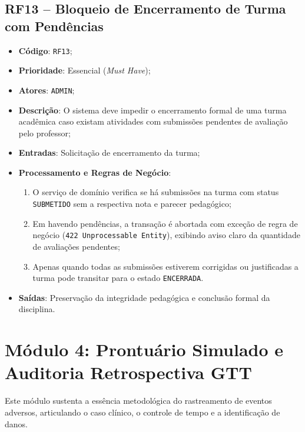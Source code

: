 \subsection{RF13 -- Bloqueio de Encerramento de Turma com Pendências}
\begin{itemize}
    \item \textbf{Código}: \texttt{RF13};
    \item \textbf{Prioridade}: Essencial (\textit{Must Have});
    \item \textbf{Atores}: \texttt{ADMIN};
    \item \textbf{Descrição}: O sistema deve impedir o encerramento formal de uma turma acadêmica caso existam atividades com submissões pendentes de avaliação pelo professor;
    \item \textbf{Entradas}: Solicitação de encerramento da turma;
    \item \textbf{Processamento e Regras de Negócio}:
    \begin{enumerate}
        \item O serviço de domínio verifica se há submissões na turma com status \texttt{SUBMETIDO} sem a respectiva nota e parecer pedagógico;
        \item Em havendo pendências, a transação é abortada com exceção de regra de negócio (\texttt{422 Unprocessable Entity}), exibindo aviso claro da quantidade de avaliações pendentes;
        \item Apenas quando todas as submissões estiverem corrigidas ou justificadas a turma pode transitar para o estado \texttt{ENCERRADA}.
    \end{enumerate}
    \item \textbf{Saídas}: Preservação da integridade pedagógica e conclusão formal da disciplina.
\end{itemize}

\section{Módulo 4: Prontuário Simulado e Auditoria Retrospectiva GTT}
\label{sec_mod4_auditoria}

Este módulo sustenta a essência metodológica do rastreamento de eventos adversos, articulando o caso clínico, o controle de tempo e a identificação de danos.

